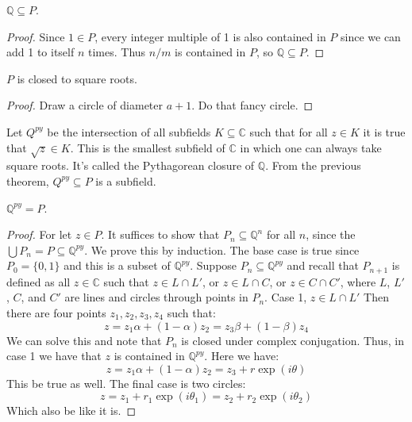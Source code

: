     \begin{theorem}
        $\mathbb{Q}\subseteq{P}$.
    \end{theorem}
    \begin{proof}
        Since $1\in{P}$, every integer multiple of 1 is also contained in
        $P$ since we can add 1 to itself $n$ times. Thus $n/m$ is contained
        in $P$, so $\mathbb{Q}\subseteq{P}$.
    \end{proof}
    \begin{theorem}
        $P$ is closed to square roots.
    \end{theorem}
    \begin{proof}
        Draw a circle of diameter $a+1$. Do that fancy circle.
    \end{proof}
    Let $Q^{py}$ be the intersection of all subfields $K\subseteq\mathbb{C}$
    such that for all $z\in{K}$ it is true that $\sqrt{z}\in{K}$. This is
    the smallest subfield of $\mathbb{C}$ in which one can always take
    square roots. It's called the Pythagorean closure of $\mathbb{Q}$. From
    the previous theorem, $Q^{py}\subseteq{P}$ is a subfield.
    \begin{theorem}
        $\mathbb{Q}^{py}=P$.
    \end{theorem}
    \begin{proof}
        For let $z\in{P}$. It suffices to show that
        $P_{n}\subseteq\mathbb{Q}^{n}$ for all $n$, since the
        $\bigcup{P}_{n}=P\subseteq\mathbb{Q}^{py}$. We prove this by
        induction. The base case is true since $P_{0}=\{0,1\}$ and this is a
        subset of $\mathbb{Q}^{py}$. Suppose $P_{n}\subseteq\mathbb{Q}^{py}$
        and recall that $P_{n+1}$ is defined as all $z\in\mathbb{C}$ such
        that $z\in{L}\cap{L}'$, or $z\in{L}\cap{C}$, or $z\in{C}\cap{C}'$,
        where $L$, $L'$, $C$, and $C'$ are lines and circles through points
        in $P_{n}$. Case 1, $z\in{L}\cap{L}'$ Then there are four points
        $z_{1},z_{2},z_{3},z_{4}$ such that:
        \begin{equation}
            z=z_{1}\alpha+(1-\alpha)z_{2}=z_{3}\beta+(1-\beta)z_{4}
        \end{equation}
        We can solve this and note that $P_{n}$ is closed under complex
        conjugation. Thus, in case 1 we have that $z$ is contained in
        $\mathbb{Q}^{py}$. Here we have:
        \begin{equation}
            z=z_{1}\alpha+(1-\alpha)z_{2}=z_{3}+r\exp(i\theta)
        \end{equation}
        This be true as well. The final case is two circles:
        \begin{equation}
            z=z_{1}+r_{1}\exp(i\theta_{1})=z_{2}+r_{2}\exp(i\theta_{2})
        \end{equation}
        Which also be like it is.
    \end{proof}
